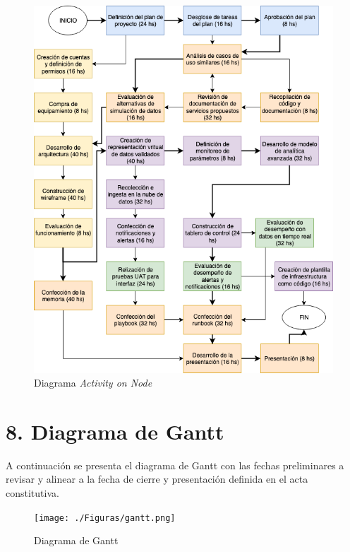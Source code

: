 \documentclass[11pt]{charter}
\begin{document}
\begin{figure}[htpb]
\centering 
\includegraphics[width=.9\textwidth]{./Figuras/AoN.png}
\caption{Diagrama \textit{Activity on Node}}
\label{fig:AON}
\end{figure}


\section{8. Diagrama de Gantt}
\label{sec:gantt}
A continuación se presenta el diagrama de Gantt con las fechas preliminares a revisar y alinear a la fecha de cierre y presentación definida en el acta constitutiva.

\begin{figure}[htpb]
\centering 
\texttt{[image: ./Figuras/gantt.png]}
\caption{Diagrama de Gantt}
\label{fig:Gantt}
\end{figure}
\end{document}

